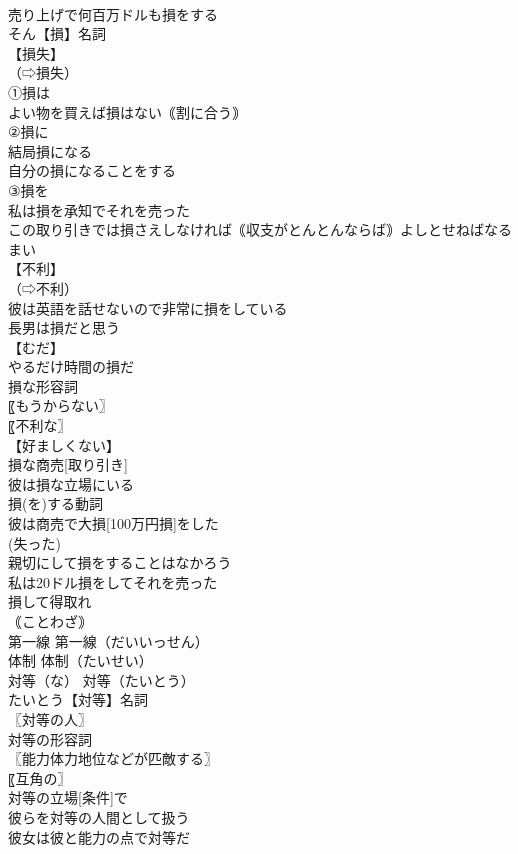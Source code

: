 \documentclass[8pt]{extreport}
\begin{document}
\begin{CJK}{UTF8}{min}
\\	売り上げで何百万ドルも損をする
\\	そん【損】名詞
\\	【損失】
\\	（⇨損失）
\\	①損は
\\	よい物を買えば損はない｟割に合う｠
\\	②損に
\\	結局損になる
\\	自分の損になることをする
\\	③損を
\\	私は損を承知でそれを売った
\\	この取り引きでは損さえしなければ｟収支がとんとんならば｠よしとせねばなるまい
\\	【不利】
\\	（⇨不利）
\\	彼は英語を話せないので非常に損をしている
\\	長男は損だと思う
\\	【むだ】
\\	やるだけ時間の損だ
\\	損な形容詞
\\	〖もうからない〗
\\	〖不利な〗
\\	【好ましくない】
\\	損な商売[取り引き]
\\	彼は損な立場にいる
\\	損(を)する動詞
\\	彼は商売で大損[100万円損]をした
\\	(失った) 
\\	親切にして損をすることはなかろう
\\	私は20ドル損をしてそれを売った
\\	損して得取れ
\\	｟ことわざ｠
\\	第一線		第一線（だいいっせん）
\\	体制		体制（たいせい）
\\	対等（な）		対等（たいとう）
\\	たいとう【対等】名詞
\\	〖対等の人〗
\\	対等の形容詞
\\	〖能力体力地位などが匹敵する〗
\\	〖互角の〗
\\	対等の立場[条件]で
\\	彼らを対等の人間として扱う
\\	彼女は彼と能力の点で対等だ

\end{CJK}
\end{document}
